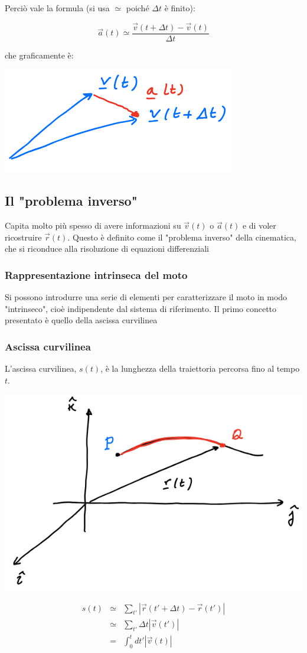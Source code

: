 \documentclass{subfiles}
\begin{document}
\noindent
Perciò vale la formula (si usa $\simeq$ poiché $\Delta t$ è finito):

$$
\vec{a}(t) \simeq \frac{\vec{v}(t + \Delta t) - \vec{v}(t)}{\Delta t}
$$

\noindent
che graficamente è:

\includegraphics[width=\columnwidth]{rappresentazione-accelerazione-grafica-approssimazione}

\subsection{Il "problema inverso"}

Capita molto più spesso di avere informazioni su $\vec{v}(t)$ o $\vec{a}(t)$ e di voler ricostruire $\vec{r}(t)$. Questo è definito come il "problema inverso" della cinematica, che si riconduce alla risoluzione di equazioni differenziali

\subsubsection{Rappresentazione intrinseca del moto}

Si possono introdurre una serie di elementi per caratterizzare il moto in modo "intrinseco", cioè indipendente dal sistema di riferimento. Il primo concetto presentato è quello della ascissa curvilinea

\subsubsection{Ascissa curvilinea}

L'ascissa curvilinea, $s(t)$, è la lunghezza della traiettoria percorsa fino al tempo $t$.

\includegraphics[width=\columnwidth]{ascissa-curvilinea}

$$
\begin{matrix}
s(t) &\simeq& \sum_{t'} |\vec{r}(t' + \Delta t) - \vec{r}(t')| \\
&\simeq& \sum_{t'} \Delta t |\vec{v}(t')| \\
&=& \int^{t}_{0}{dt' |\vec{v}(t)|}
\end{matrix}
$$
\end{document}

